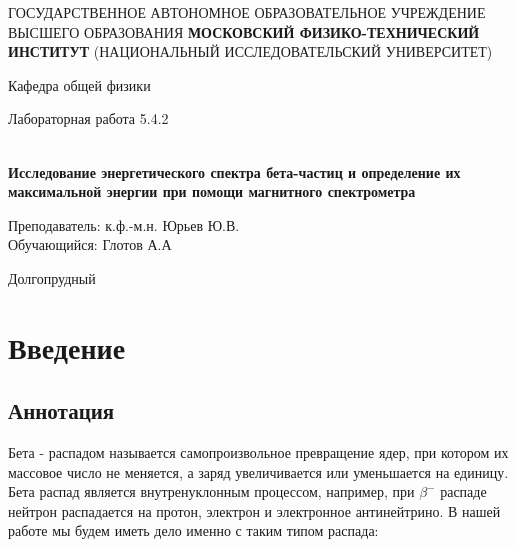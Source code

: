 \documentclass[12pt,a4paper]{article}
\author{Глотов Алексей}
\begin{document}
\newpage
\begin{center}
\footnotesize{{ГОСУДАРСТВЕННОЕ АВТОНОМНОЕ ОБРАЗОВАТЕЛЬНОЕ УЧРЕЖДЕНИЕ}\break
{ВЫСШЕГО ОБРАЗОВАНИЯ}
\break
{\bf {МОСКОВСКИЙ ФИЗИКО-ТЕХНИЧЕСКИЙ ИНСТИТУТ}}
\break
\small{(НАЦИОНАЛЬНЫЙ ИССЛЕДОВАТЕЛЬСКИЙ УНИВЕРСИТЕТ)}}
\break
\hfill \break
\hfill \break
\begin{center}
\normalsize{Кафедра общей физики}
\end{center}
\hfill \break
\hfill \break
\hfill \break
\hfill \break

\begin{center}
\normalsize {Лабораторная работа 5.4.2}
\end{center}
\hfill \break\\
\large{\textbf{Исследование энергетического спектра бета-частиц и определение их максимальной энергии при помощи магнитного спектрометра}}
\end{center}
\begin{flushleft}
\hfill \break
\hfill \break
\hfill \break
\hfill \break
\hfill \break
\hfill \break
\hfill \break
\hfill \break
\hfill \break
\hfill \break
\hangindent=10cm
\normalsize{Преподаватель:} \;\;\;\;
\normalsize{к.ф.-м.н. Юрьев Ю.В.}\\
\hfill \break
\normalsize{Обучающийся:} \;\;\;\;\;
\normalsize{Глотов А.А} \\
\hfill \break
\end{flushleft}
\hfill \break
\hfill \break
\hfill \break
\hfill \break
\hfill \break
\hfill \break
\hfill \break
\hfill \break
\hfill \break
\hfill \break
\hfill \break

\begin{center}
Долгопрудный 
\end{center}

\thispagestyle{empty}


\newpage
\section{Введение}

\subsection{Аннотация}

	Бета - распадом называется самопроизвольное превращение ядер, при котором их массовое число не меняется, а заряд увеличивается или уменьшается на единицу. Бета распад является внутренуклонным процессом, например, при $\beta^-$ распаде нейтрон распадается на протон, электрон и электронное антинейтрино. В нашей работе мы будем иметь дело именно с таким типом распада:
\end{document}
